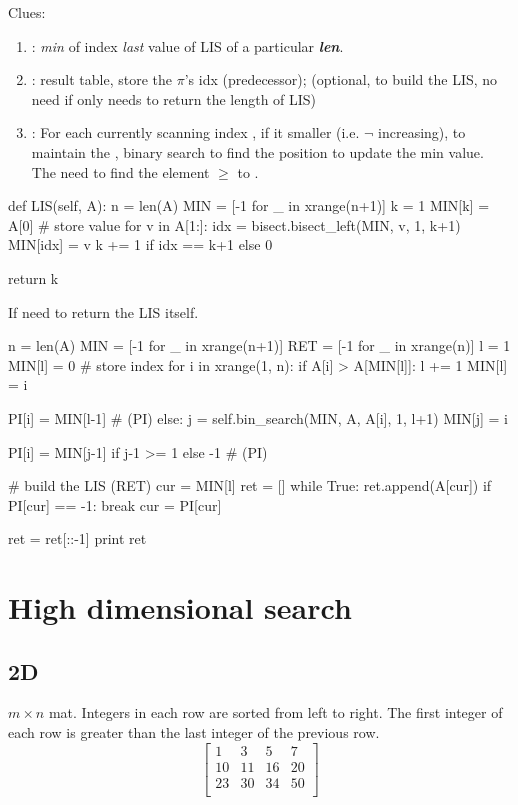 Clues:
\begin{enumerate}
\item {}: \textit{min} of index \textit{last} value of LIS of a particular \textit{\textbf{len}}.
\item {}: result table, store the $\pi$'s idx (predecessor); (optional, to build the LIS, no need if only needs to return the length of LIS)
\item {}: For each currently scanning index , if it smaller (i.e. $\neg$ increasing), to maintain the , binary search to find the position to update the min value. The  need to find the element $\geq$ to .
\end{enumerate}
\newpage
\begin{python}
def LIS(self, A):
    n = len(A)
    MIN = [-1 for _ in xrange(n+1)]
    k = 1
    MIN[k] = A[0]  # store value
    for v in A[1:]:
        idx = bisect.bisect_left(MIN, v, 1, k+1)
        MIN[idx] = v
        k += 1 if idx == k+1 else 0

    return k
\end{python}
If need to return the LIS itself. 
\begin{python}
    n = len(A)
    MIN = [-1 for _ in xrange(n+1)]
    RET = [-1 for _ in xrange(n)]
    l = 1
    MIN[l] = 0  # store index
    for i in xrange(1, n):
        if A[i] > A[MIN[l]]:
            l += 1
            MIN[l] = i

            PI[i] = MIN[l-1]  # (PI)
        else:
            j = self.bin_search(MIN, A, A[i], 1, l+1)
            MIN[j] = i

            PI[i] = MIN[j-1] if j-1 >= 1 else -1  # (PI)

    # build the LIS (RET)
    cur = MIN[l]
    ret = []
    while True:
        ret.append(A[cur])
        if PI[cur] == -1: break
        cur = PI[cur]

    ret = ret[::-1]
    print ret
\end{python}

\section{High dimensional search}
\subsection{2D}
 $m\times n$ mat. Integers in each row are sorted from left to right. The first integer of each row is greater than the last integer of the previous row.
$$
\begin{bmatrix}
1 & 3 & 5 & 7 \\
10 & 11 & 16 & 20 \\
23 & 30 & 34 & 50 \\
\end{bmatrix}
$$

